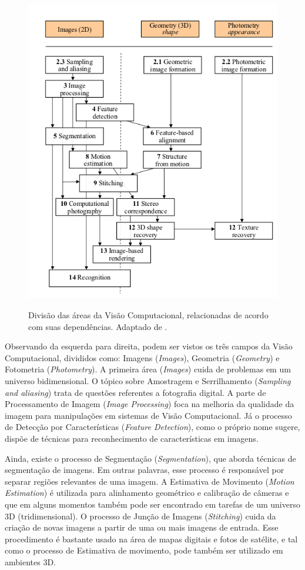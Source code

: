 \begin{figure}[H]
    \centering
    {\includegraphics[scale=0.75]{figuras/diagrama_vc}}
    \caption{Divisão das áreas da Visão Computacional, relacionadas de acordo com suas dependências. Adaptado de \cite{SZELISKI}.}
    \label{img:diagrama_vc}
\end{figure}

Observando da esquerda para direita, podem ser vistos os três campos da Visão Computacional, divididos como: Imagens (\textit{Images}), Geometria (\textit{Geometry}) e Fotometria (\textit{Photometry}). A primeira área (\textit{Images}) cuida de problemas em um universo bidimensional. O tópico sobre Amostragem e Serrilhamento (\textit{Sampling and aliasing}) trata de questões referentes a fotografia digital. A parte de Processamento de Imagem (\textit{Image Processing}) foca na melhoria da qualidade da imagem para manipulações em sistemas de Visão Computacional. Já o processo de Detecção por Características (\textit{Feature Detection}), como o próprio nome sugere, dispõe de técnicas para reconhecimento de características em imagens.

Ainda, existe o processo de Segmentação (\textit{Segmentation}), que aborda técnicas de segmentação de imagens. Em outras palavras, esse processo é responsável por separar regiões relevantes de uma imagem. A Estimativa de Movimento (\textit{Motion Estimation}) é utilizada para alinhamento geométrico e calibração de câmeras e que em alguns momentos também pode ser encontrado em tarefas de um universo 3D (tridimensional). O processo de Junção de Imagens (\textit{Stitching}) cuida da criação de novas imagens a partir de uma ou mais imagens de entrada. Esse procedimento é bastante usado na área de mapas digitais e fotos de satélite, e tal como o processo de Estimativa de movimento, pode também ser utilizado em ambientes 3D.

